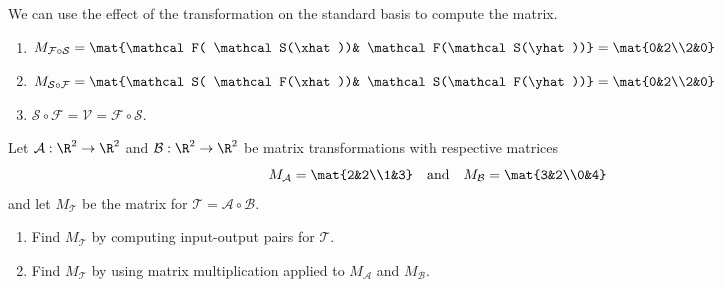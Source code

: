 \begin{exercises}
\begin{problist}
\begin{solution}
\begin{enumerate}
					We can use the effect of the transformation on the
					standard basis to compute the matrix.
					\begin{enumerate}
						\item $M_{\mathcal F \circ \mathcal S}=\mat{\mathcal
							F( \mathcal S(\xhat))& \mathcal F(\mathcal
							S(\yhat))}=\mat{0&2\\2&0}$

						\item $M_{\mathcal S \circ \mathcal F}=\mat{\mathcal
							S( \mathcal F(\xhat))& \mathcal S(\mathcal
							F(\yhat))}=\mat{0&2\\2&0}$

						\item $\mathcal S\circ \mathcal F=
							\mathcal V = \mathcal F \circ
							\mathcal S$.
					\end{enumerate}
			\end{enumerate}
		\end{solution}

		\prob Let $\mathcal A: \R^{2}\to \R^{2}$ and
		$\mathcal B: \R^{2}\to \R^{2}$ be matrix transformations with respective matrices
		\[
			M_{\mathcal A}= \mat{2&2\\1&3}\quad \text{and}\quad M_{\mathcal B}=
			\mat{3&2\\0&4}
		\]
		 and let $M_{\mathcal T}$ be the matrix for
		$\mathcal T=\mathcal A\circ\mathcal B$.
		\begin{enumerate}
			\item Find $M_{\mathcal T}$ by computing input-output pairs for $\mathcal
				T$.

			\item Find $M_{\mathcal T}$ by using matrix multiplication applied
				to $M_{\mathcal A}$ and $M_{\mathcal B}$.
		\end{enumerate}


		\begin{solution}


\end{solution}
\end{problist}
\end{exercises}
